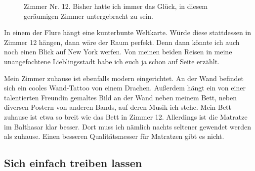 \documentclass[fontsize=14pt,a4paper,headinclude,DIV=calc,automark]{scrbook}
\begin{document}
\setlength{\fboxsep}{0pt}    %
\setlength{\fboxrule}{0.2pt} %
\begin{figure}[ht]
    \raggedright
    \caption{Zimmer Nr. 12. Bisher hatte ich immer das Glück, in diesem geräumigen Zimmer untergebracht zu sein.}
    \label{fig:zimmer_12}
\end{figure}

In einem der Flure hängt eine kunterbunte Weltkarte. Würde diese stattdessen in Zimmer 12 hängen, dann wäre der Raum perfekt. Denn dann könnte ich auch noch einen Blick auf New York werfen. Von meinen beiden Reisen in meine unangefochtene Lieblingsstadt habe ich euch ja schon auf Seite \pageref{sec:new_york} erzählt.

Mein Zimmer zuhause ist ebenfalls modern eingerichtet. An der Wand befindet sich ein cooles Wand-Tattoo von einem Drachen. Außerdem hängt ein von einer talentierten Freundin gemaltes Bild an der Wand neben meinem Bett, neben diversen Postern von anderen Bands, auf deren Musik ich stehe. Mein Bett zuhause ist etwa so breit wie das Bett in Zimmer 12. Allerdings ist die Matratze im Balthasar klar besser. Dort muss ich nämlich nachts seltener gewendet werden als zuhause. Einen besseren Qualitätsmesser für Matratzen gibt es nicht.

\subsection{Sich einfach treiben lassen}
\end{document}
